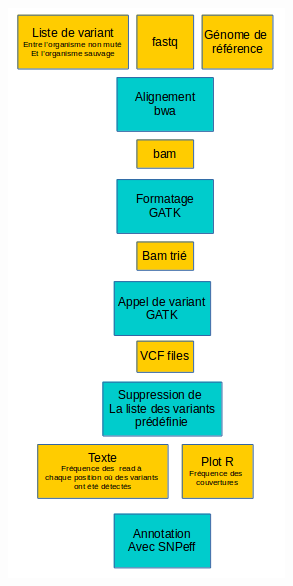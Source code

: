 \documentclass[12pt]{article}
\begin{document}

\begin{center} \includegraphics[scale=0.8]{schemaPipeline.png} \end{center}
\end{document}
